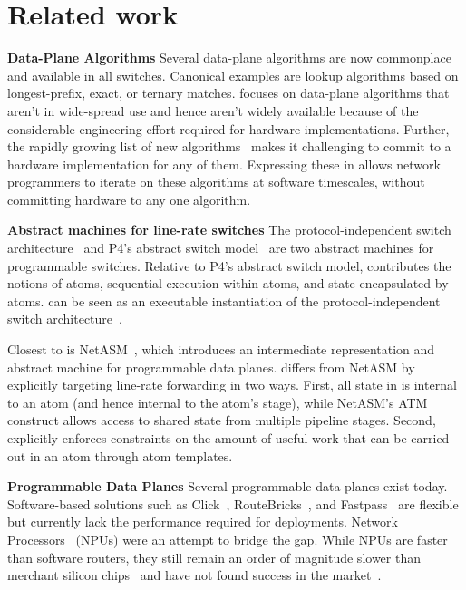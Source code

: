 \section{Related work}
\label{s:related}

\textbf{Data-Plane Algorithms}
Several data-plane algorithms are now commonplace and available in all
switches. Canonical examples are lookup algorithms based on longest-prefix,
exact, or ternary matches. \pktlanguage focuses on data-plane algorithms that
aren't in wide-spread use and hence aren't widely available because of the
considerable engineering effort required for hardware implementations. Further,
the rapidly growing list of new algorithms~\cite{pdq, d3, detail, codel, conga}
makes it challenging to commit to a hardware implementation for any of them.
Expressing these in \pktlanguage allows network programmers to iterate on these
algorithms at software timescales, without committing hardware to any one
algorithm.

\textbf{Abstract machines for line-rate switches}
The protocol-independent switch architecture~\cite{nick_p4} and P4's abstract
switch model~\cite{p4} are two abstract machines for programmable switches.
Relative to P4's abstract switch model, \absmachine contributes the notions of
atoms, sequential execution within atoms, and state encapsulated by atoms.
\absmachine can be seen as an executable instantiation of the
protocol-independent switch architecture~\cite{nick_p4}.

Closest to \absmachine is NetASM~\cite{netasm}, which introduces an
intermediate representation and abstract machine for programmable data planes.
\absmachine differs from NetASM by explicitly targeting line-rate forwarding in
two ways.  First, all state in \absmachine is internal to an atom (and hence
internal to the atom's stage), while NetASM's ATM construct allows access to
shared state from multiple pipeline stages. Second, \absmachine explicitly
enforces constraints on the amount of useful work that can be carried out in an
atom through atom templates.

\textbf{Programmable Data Planes}
Several programmable data planes exist today. Software-based solutions such as
Click~\cite{click}, RouteBricks~\cite{routebricks}, and
Fastpass~\cite{fastpass} are flexible but currently lack the performance
required for deployments. Network Processors~\cite{ixp2800, ixp4xx} (NPUs) were
an attempt to bridge the gap.  While NPUs are faster than software routers,
they still remain an order of magnitude slower than merchant silicon
chips~\cite{rmt} and have not found success in the market~\cite{npfail}.

